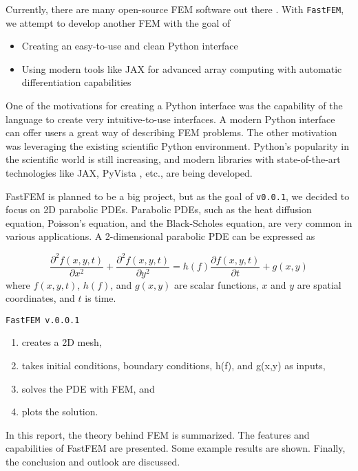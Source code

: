 \documentclass[headings=standardclasses, abstract=true]{scrartcl}
\begin{document}
Currently, there are many open-source FEM software out there \cite{fem_getdp, fem_agros, fem_calculix, fem_elmerfem, fem_freefem, fem_goma, fem_fenicsx, fem_dealii}. With \texttt{FastFEM}, we attempt to develop another FEM with the goal of

\begin{itemize}
    \item Creating an easy-to-use and clean Python interface
    \item Using modern tools like JAX \cite{jax2018github} for advanced array computing with automatic differentiation capabilities
\end{itemize}

One of the motivations for creating a Python interface was the capability of the language to create very intuitive-to-use interfaces. A modern Python interface can offer users a great way of describing FEM problems. The other motivation was leveraging the existing scientific Python environment. Python's popularity in the scientific world is still increasing, and modern libraries with state-of-the-art technologies like JAX, PyVista \cite{Sullivan2019}, etc., are being developed.


FastFEM is planned to be a big project, but as the goal of \texttt{v0.0.1}, we decided to focus on 2D parabolic PDEs. Parabolic PDEs, such as the heat diffusion equation, Poisson's equation, and the Black-Scholes equation, are very common in various applications. A 2-dimensional parabolic PDE can be expressed as

\begin{equation*}
    \frac{\partial^2 f(x,y,t)}{\partial x^2} + \frac{\partial^2 f(x,y,t)}{\partial y^2}
    =
    h(f) \frac{\partial f(x,y,t)}{\partial t} + g(x,y)
    \label{pde}
\end{equation*}
where $f(x,y,t)$, $h(f)$, and $g(x,y)$ are scalar functions, $x$ and $y$ are spatial coordinates, and $t$ is time.

\texttt{FastFEM v.0.0.1}
\begin{enumerate}
    \item creates a 2D mesh,
    \item takes initial conditions, boundary conditions, h(f), and g(x,y) as inputs,
    \item solves the PDE with FEM, and
    \item plots the solution.
\end{enumerate}


In this report, the theory behind FEM is summarized. The features and capabilities of FastFEM are presented. Some example results are shown. Finally, the conclusion and outlook are discussed.
\end{document}
